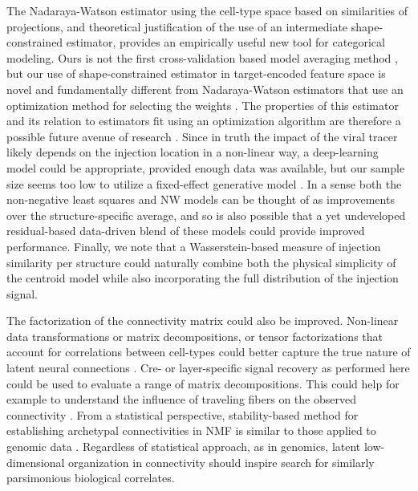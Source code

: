 The Nadaraya-Watson estimator using the cell-type space based on similarities of projections, and theoretical justification of the use of an intermediate shape-constrained estimator, provides an empirically useful new tool for categorical modeling.
Ours is not the first cross-validation based model averaging method \citep{Gao2016-qe}, but our use of shape-constrained estimator in target-encoded feature space is novel and fundamentally different from Nadaraya-Watson estimators that use an optimization method for selecting the weights \citep{Saul2003-th}.
The properties of this estimator and its relation to estimators fit using an optimization algorithm are therefore a possible future avenue of research \citep{Groeneboom2018-ow, Salha_undated-ev}.
Since in truth the impact of the viral tracer likely depends on the injection location in a non-linear way, a deep-learning model could be appropriate, provided enough data was available, but our sample size seems too low to utilize a fixed-effect generative model \citep{Lotfollahi2019-tr}.
In a sense both the non-negative least squares \citet{Oh2014-kh} and NW models can be thought of as improvements over the structure-specific average, and so is also possible that a yet undeveloped residual-based data-driven blend of these models could provide improved performance.
Finally, we note that a Wasserstein-based measure of injection similarity per structure could naturally combine both the physical simplicity of the centroid model while also incorporating the full distribution of the injection signal.

The factorization of the connectivity matrix could also be improved.
Non-linear data transformations or matrix decompositions, or tensor factorizations that account for correlations between cell-types could better capture the true nature of latent neural connections \citep{Harris2016-fn}.
Cre- or layer-specific signal recovery as performed here could be used to evaluate a range of matrix decompositions.
This could help for example to understand the influence of traveling fibers on the observed connectivity \citep{Llano2008-ne}.
From a statistical perspective, stability-based method for establishing archetypal connectivities in NMF is similar to those applied to genomic data \cite{Wu2016-gg, Kotliar2019-yj}.
Regardless of statistical approach, as in genomics, latent low-dimensional organization in connectivity should inspire search for similarly parsimonious biological correlates.